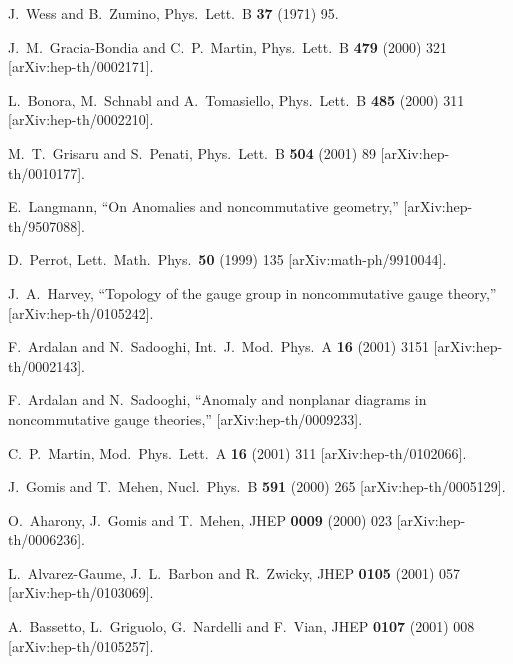 \documentclass[a4paper,12pt]{article}
\begin{document}
\begin{thebibliography}{99}
J.~Wess and B.~Zumino,
Phys.\ Lett.\ B {\bf 37} (1971) 95.


J.~M.~Gracia-Bondia and C.~P.~Martin,
Phys.\ Lett.\ B {\bf 479} (2000) 321
[arXiv:hep-th/0002171].

L.~Bonora, M.~Schnabl and A.~Tomasiello,
Phys.\ Lett.\ B {\bf 485} (2000) 311
[arXiv:hep-th/0002210].

M.~T.~Grisaru and S.~Penati,
Phys.\ Lett.\ B {\bf 504} (2001) 89
[arXiv:hep-th/0010177].

E.~Langmann,
``On Anomalies and noncommutative geometry,''
[arXiv:hep-th/9507088].

D.~Perrot,
Lett.\ Math.\ Phys.\  {\bf 50} (1999) 135
[arXiv:math-ph/9910044].

J.~A.~Harvey,
``Topology of the gauge group in noncommutative gauge theory,''
[arXiv:hep-th/0105242].

F.~Ardalan and N.~Sadooghi,
Int.\ J.\ Mod.\ Phys.\ A {\bf 16} (2001) 3151
[arXiv:hep-th/0002143].

F.~Ardalan and N.~Sadooghi,
``Anomaly and nonplanar diagrams in noncommutative gauge theories,''
[arXiv:hep-th/0009233].

C.~P.~Martin,
Mod.\ Phys.\ Lett.\ A {\bf 16} (2001) 311
[arXiv:hep-th/0102066].

J.~Gomis and T.~Mehen,
Nucl.\ Phys.\ B {\bf 591} (2000) 265
[arXiv:hep-th/0005129].

O.~Aharony, J.~Gomis and T.~Mehen,
JHEP {\bf 0009} (2000) 023
[arXiv:hep-th/0006236].


L.~Alvarez-Gaume, J.~L.~Barbon and R.~Zwicky,
JHEP {\bf 0105} (2001) 057
[arXiv:hep-th/0103069].

A.~Bassetto, L.~Griguolo, G.~Nardelli and F.~Vian,
JHEP {\bf 0107} (2001) 008
[arXiv:hep-th/0105257].


\end{thebibliography}
\end{document}
